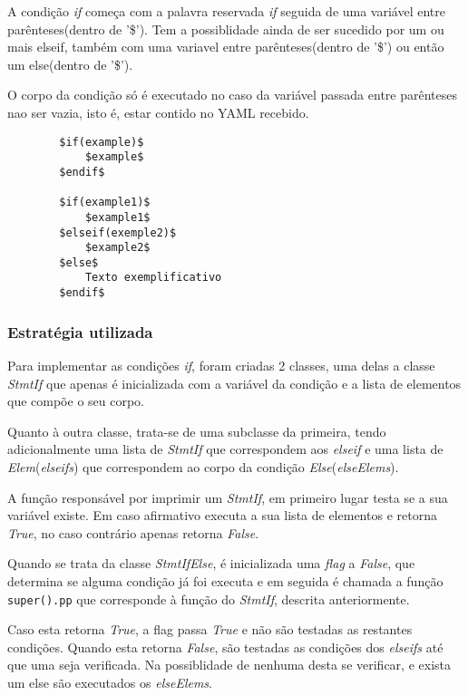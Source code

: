 \documentclass[../relatorio.tex]{subfiles}
\begin{document}
    A condição \textit{if} começa com a palavra reservada \textit{if}
    seguida de uma variável entre parênteses(dentro de '\$'). Tem a
    possiblidade ainda de ser sucedido por um ou mais elseif, também com 
    uma variavel entre parênteses(dentro de '\$') ou então um else(dentro de '\$').
    
    O corpo da condição só é executado no caso da variável passada entre parênteses
    nao ser vazia, isto é, estar contido no YAML recebido.

    \begin{verbatim}
        $if(example)$
            $example$
        $endif$

        $if(example1)$
            $example1$
        $elseif(exemple2)$
            $example2$
        $else$
            Texto exemplificativo   
        $endif$
    \end{verbatim}

    \subsubsection{Estratégia utilizada}

    Para implementar as condições \textit{if}, foram criadas 2 classes,
    uma delas a classe \textit{StmtIf} que apenas é inicializada com 
    a variável da condição e a lista de elementos que compõe o seu corpo.

    Quanto à outra classe, trata-se de uma subclasse da primeira, tendo 
    adicionalmente uma lista de \textit{StmtIf} que correspondem aos
    \textit{elseif} e uma lista de \textit{Elem}(\textit{elseifs}) que correspondem ao corpo
    da condição \textit{Else}(\textit{elseElems}). 

    A função responsável por imprimir um \textit{StmtIf}, em primeiro lugar testa se a sua 
    variável existe. Em caso afirmativo executa a sua lista de elementos e retorna \textit{True},
    no caso contrário apenas retorna \textit{False}. 
    
    Quando se trata da classe \textit{StmtIfElse}, é inicializada uma \textit{flag} a \textit{False},
    que determina se alguma condição já foi executa e em seguida é chamada a função 
    \texttt{super().pp} que corresponde à função do \textit{StmtIf}, descrita anteriormente.

    Caso esta retorna \textit{True}, a flag passa \textit{True} e não são testadas as restantes condições. 
    Quando esta retorna \textit{False}, são testadas as condições dos \textit{elseifs} até que uma seja verificada. 
    Na possiblidade de nenhuma desta se verificar, e exista um else são executados os \textit{elseElems}.

    
\end{document}
